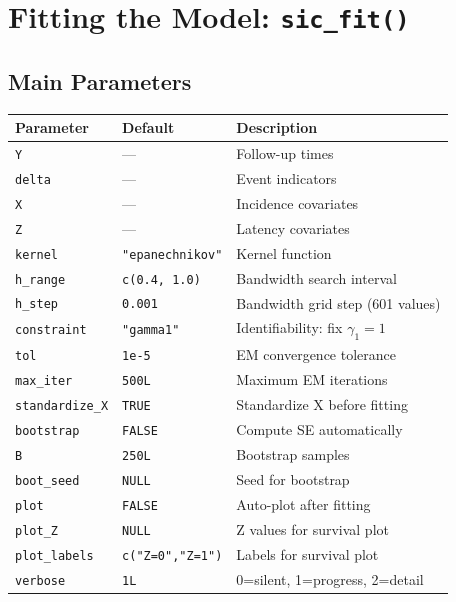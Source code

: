 \documentclass[12pt,a4paper]{article}
\begin{document}
\section{Fitting the Model: \texttt{sic\_fit()}}

\subsection{Main Parameters}

\begin{longtable}{lll}
  \toprule
  \textbf{Parameter} & \textbf{Default} & \textbf{Description} \\
  \midrule
  \texttt{Y}            & ---         & Follow-up times \\
  \texttt{delta}        & ---         & Event indicators \\
  \texttt{X}            & ---         & Incidence covariates \\
  \texttt{Z}            & ---         & Latency covariates \\
  \texttt{kernel}       & \texttt{"epanechnikov"} &
    Kernel function \\
  \texttt{h\_range}     & \texttt{c(0.4, 1.0)} &
    Bandwidth search interval \\
  \texttt{h\_step}      & \texttt{0.001} &
    Bandwidth grid step (601 values) \\
  \texttt{constraint}   & \texttt{"gamma1"} &
    Identifiability: fix $\gamma_1=1$ \\
  \texttt{tol}          & \texttt{1e-5} &
    EM convergence tolerance \\
  \texttt{max\_iter}    & \texttt{500L} &
    Maximum EM iterations \\
  \texttt{standardize\_X} & \texttt{TRUE} &
    Standardize X before fitting \\
  \texttt{bootstrap}    & \texttt{FALSE} &
    Compute SE automatically \\
  \texttt{B}            & \texttt{250L} &
    Bootstrap samples \\
  \texttt{boot\_seed}   & \texttt{NULL} &
    Seed for bootstrap \\
  \texttt{plot}         & \texttt{FALSE} &
    Auto-plot after fitting \\
  \texttt{plot\_Z}      & \texttt{NULL} &
    Z values for survival plot \\
  \texttt{plot\_labels} & \texttt{c("Z=0","Z=1")} &
    Labels for survival plot \\
  \texttt{verbose}      & \texttt{1L} &
    0=silent, 1=progress, 2=detail \\
  \bottomrule
\end{longtable}
\end{document}
